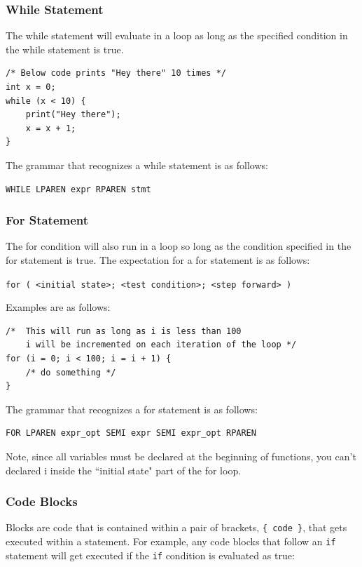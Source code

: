 \documentclass{article}
\begin{document}
\subsubsection{While Statement}
The while statement will evaluate in a loop as long as the specified condition in the while statement is true.

\begin{lstlisting}
/* Below code prints "Hey there" 10 times */
int x = 0;
while (x < 10) {
	print("Hey there");
	x = x + 1;
}
\end{lstlisting}

The grammar that recognizes a while statement is as follows:
\begin{Verbatim}[frame=single]
WHILE LPAREN expr RPAREN stmt
\end{Verbatim}

\subsubsection{For Statement}
The for condition will also run in a loop so long as the condition specified in the for statement is true.  The expectation for a for statement is as follows:

\texttt{for ( <initial state>; <test condition>; <step forward> )}

Examples are as follows:

\begin{lstlisting}
/* 	This will run as long as i is less than 100
	i will be incremented on each iteration of the loop */
for (i = 0; i < 100; i = i + 1) {
	/* do something */
}
\end{lstlisting}

The grammar that recognizes a for statement is as follows:
\begin{Verbatim}[frame=single]
FOR LPAREN expr_opt SEMI expr SEMI expr_opt RPAREN
\end{Verbatim}
Note, since all variables must be declared at the beginning of functions, you can't declared i inside the  ``initial state" part of the for loop.
\subsubsection{Code Blocks}
Blocks are code that is contained within a pair of brackets, \texttt{\{ code \}}, that gets executed within a statement.  For example, any code blocks that follow an \texttt{if} statement will get executed if the \texttt{if} condition is evaluated as true:
\end{document}
